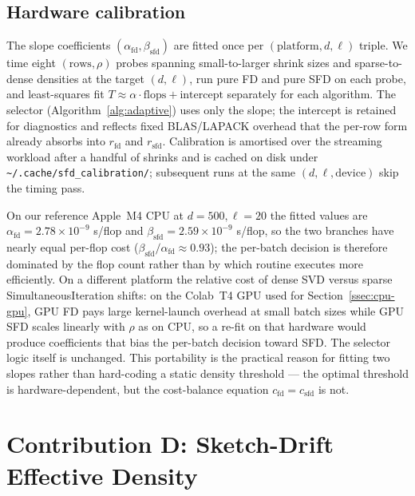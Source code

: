 \documentclass[11pt]{article}
\begin{document}
\subsection{Hardware calibration}
\label{ssec:calib}

The slope coefficients $(\alpha_{\mathrm{fd}}, \beta_{\mathrm{sfd}})$ are
fitted once per $(\mathrm{platform}, d, \ell)$ triple. We time eight
$(\mathrm{rows}, \rho)$ probes spanning small-to-larger shrink sizes and
sparse-to-dense densities at the target $(d, \ell)$, run pure FD and pure
SFD on each probe, and least-squares fit
$T \approx \alpha\cdot \mathrm{flops} + \mathrm{intercept}$ separately for
each algorithm. The selector (Algorithm~\ref{alg:adaptive}) uses only the
slope; the intercept is retained for diagnostics and reflects fixed
BLAS/LAPACK overhead that the per-row form already absorbs into
$r_{\mathrm{fd}}$ and $r_{\mathrm{sfd}}$. Calibration is amortised over the
streaming workload after a handful of shrinks and is cached on disk under
\verb|~/.cache/sfd_calibration/|; subsequent runs at the same $(d, \ell,
\mathrm{device})$ skip the timing pass.

On our reference Apple~M4 CPU at $d = 500, \ell = 20$ the fitted values are
$\alpha_{\mathrm{fd}} = 2.78 \times 10^{-9}$ s/flop and $\beta_{\mathrm{sfd}}
= 2.59 \times 10^{-9}$ s/flop, so the two branches have nearly equal
per-flop cost ($\beta_{\mathrm{sfd}} / \alpha_{\mathrm{fd}} \approx 0.93$);
the per-batch decision is therefore dominated by the flop count rather than
by which routine executes more efficiently. On a different platform the
relative cost of dense SVD versus sparse SimultaneousIteration shifts: on
the Colab~T4 GPU used for Section~\ref{ssec:cpu-gpu}, GPU FD pays large
kernel-launch overhead at small batch sizes while GPU SFD scales linearly
with $\rho$ as on CPU, so a re-fit on that hardware would produce
coefficients that bias the per-batch decision toward SFD. The selector
logic itself is unchanged. This portability is the practical reason for
fitting two slopes rather than hard-coding a static density threshold ---
the optimal threshold is hardware-dependent, but the cost-balance equation
$c_{\mathrm{fd}} = c_{\mathrm{sfd}}$ is not.

\section{Contribution D: Sketch-Drift Effective Density}
\label{sec:rho-eff}
\end{document}
